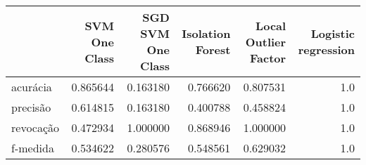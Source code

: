 \begin{tabular}{lrrrrr}
\toprule
{} &  SVM One Class &  SGD SVM One Class &  Isolation Forest &  Local Outlier Factor &  Logistic regression \\
\midrule
acurácia  &       0.865644 &           0.163180 &          0.766620 &              0.807531 &                  1.0 \\
precisão  &       0.614815 &           0.163180 &          0.400788 &              0.458824 &                  1.0 \\
revocação &       0.472934 &           1.000000 &          0.868946 &              1.000000 &                  1.0 \\
f-medida  &       0.534622 &           0.280576 &          0.548561 &              0.629032 &                  1.0 \\
\bottomrule
\end{tabular}
